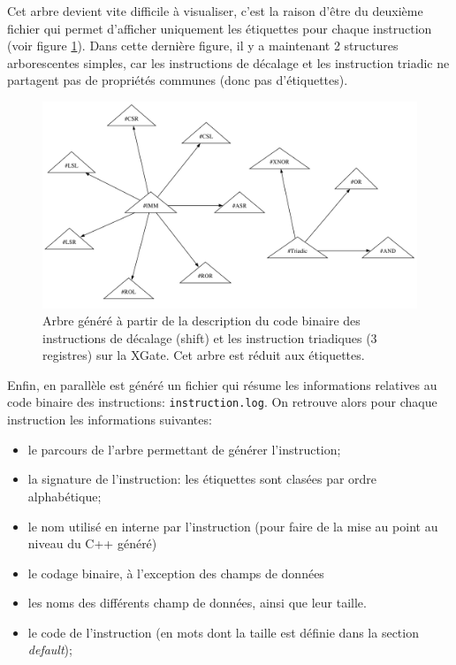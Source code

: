 Cet arbre devient vite difficile à visualiser, c'est la raison d'être du deuxième fichier qui permet d'afficher uniquement les étiquettes pour chaque instruction (voir figure \ref{fig:formatRefTest}). Dans cette dernière figure, il y a maintenant 2 structures arborescentes simples, car les instructions de décalage et les instruction triadic ne partagent pas de propriétés communes (donc pas d'étiquettes).

\begin{figure}[h]		%
  \begin{center}
    \includegraphics[width=\linewidth]{../common/images/format_ref_test.pdf}
    \caption{Arbre généré à partir de la description du code binaire des instructions de décalage (shift) et les instruction triadiques (3 registres) sur la XGate. Cet arbre est réduit aux étiquettes.}
    \label{fig:formatRefTest}
  \end{center}
\end{figure}

Enfin, en parallèle est généré un fichier qui résume les informations relatives au code binaire des instructions: \texttt{instruction.log}. On retrouve alors pour chaque instruction les informations suivantes:
\begin{itemize}
\item le parcours de l'arbre permettant de générer l'instruction;
\item la signature de l'instruction: les étiquettes sont clasées par ordre alphabétique;
\item le nom utilisé en interne par l'instruction (pour faire de la mise au point au niveau du C++ généré)
\item le codage binaire, à l'exception des champs de données
\item les noms des différents champ de données, ainsi que leur taille.
\item le code de l'instruction (en mots dont la taille est définie dans la section \emph{default});
\end{itemize}

